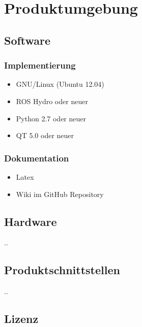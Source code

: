 \chapter{Produktumgebung}

\section{Software}
\subsection{Implementierung}
\begin{itemize}
  \item GNU/Linux (Ubuntu 12.04)
  \item ROS Hydro oder neuer
  \item Python 2.7 oder neuer
  \item QT 5.0 oder neuer
\end{itemize}

\subsection{Dokumentation}
\begin{itemize}
  \item Latex
  \item Wiki im GitHub Repository
\end{itemize}

\section{Hardware}
..
\section{Produktschnittstellen}
..

\section{Lizenz}